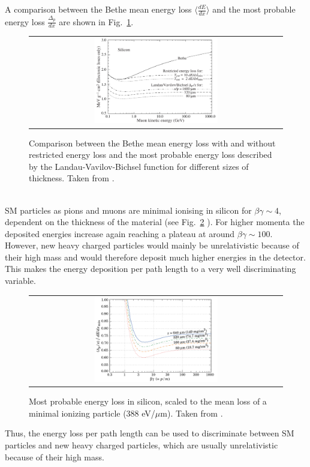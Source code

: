 A comparison between the Bethe mean energy loss $\langle \frac{dE}{dx} \rangle$ and the most probable energy loss $\frac{\Delta_p}{dx}$ are shown in Fig.~\ref{fig:dEdx_Bethe_Landau}.
\begin{figure}[!bt]
  \centering 
  \begin{tabular}{c}
  \includegraphics[width=0.5\textwidth]{figures/analysis/dEdx_Bethe_Landau.png}
  \end{tabular}
  \caption{Comparison between the Bethe mean energy loss with and without restricted energy loss and the most probable energy loss described by the Landau-Vavilov-Bichsel function for different sizes of thickness. 
           Taken from \cite{bib:PDG_2014}.} 
  \label{fig:dEdx_Bethe_Landau}
\end{figure}
\\

SM particles as pions and muons are minimal ionising in silicon for $\beta\gamma \sim 4$, dependent on the thickness of the material (see Fig.~\ref{fig:dEdx_Landau_Silicon} ). 
For higher momenta the deposited energies increase again reaching a plateau at around $\beta\gamma\sim100$. 
However, new heavy charged particles would mainly be unrelativistic because of their high mass and would therefore deposit much higher energies in the detector.
This makes the energy deposition per path length to a very well discriminating variable.
\begin{figure}[!bt]
  \centering 
  \begin{tabular}{c}
  \includegraphics[width=0.5\textwidth]{figures/analysis/dEdx_Landau_Silicon.png}
  \end{tabular}
  \caption{Most probable energy loss in silicon, scaled to the mean loss of a minimal ionizing particle (388 eV/$\mu$m). Taken from \cite{bib:PDG_2014}.} 
  \label{fig:dEdx_Landau_Silicon}
\end{figure}
Thus, the energy loss per path length can be used to discriminate between SM particles and new heavy charged particles, which are usually unrelativistic because of their high mass.

